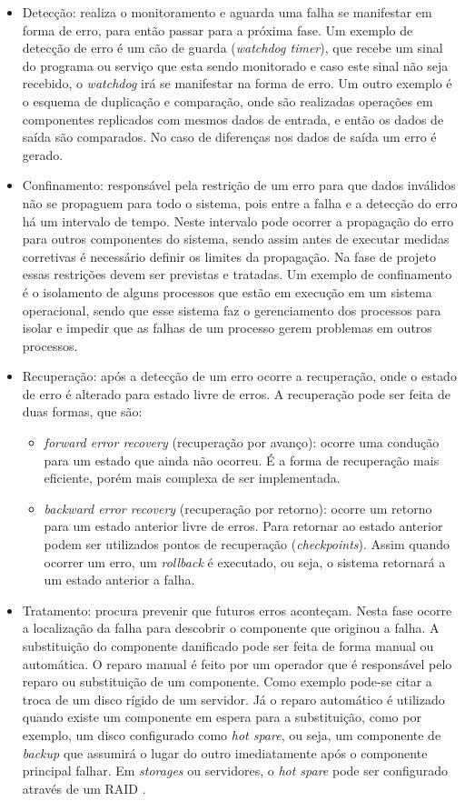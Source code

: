 \begin{itemize}
 \item Detecção: realiza o monitoramento e aguarda uma falha se manifestar em forma de erro, para então passar para a próxima fase. 
 Um exemplo de detecção de erro é um cão de guarda (\textit{watchdog timer}), que recebe um sinal do programa ou serviço que esta sendo 
 monitorado e caso este sinal não seja recebido, o \textit{watchdog} irá se manifestar na forma de erro. 
 Um outro exemplo é o esquema de duplicação e comparação, onde são realizadas operações em componentes replicados com mesmos dados de 
 entrada, e então os dados de saída são comparados. No caso de diferenças nos dados de saída um erro é gerado.
 \item Confinamento: responsável pela restrição de um erro para que dados inválidos não se propaguem para todo o sistema, pois entre a falha e a
 detecção do erro há um intervalo de tempo. Neste intervalo pode ocorrer a propagação do erro para outros componentes do sistema, sendo assim 
 antes de executar medidas corretivas é necessário definir os limites da propagação. Na fase de projeto essas restrições devem ser previstas
 e tratadas. Um exemplo de confinamento é o isolamento de alguns processos que estão em execução em um sistema operacional, sendo que esse 
 sistema faz o gerenciamento dos processos para isolar e impedir que as falhas de um processo gerem problemas em outros processos.
 \item Recuperação: após a detecção de um erro ocorre a recuperação, onde o estado de erro é alterado para estado livre de erros. A recuperação
 pode ser feita de duas formas, que são:
 \begin{itemize}
  \item \textit{forward error recovery} (recuperação por avanço): ocorre uma condução para um estado que ainda não ocorreu. É a forma
  de recuperação mais eficiente, porém mais complexa de ser implementada.
  \item \textit{backward error recovery} (recuperação por retorno): ocorre um retorno para um estado anterior livre de erros.
  Para retornar ao estado anterior podem ser utilizados pontos de recuperação (\textit{checkpoints}). Assim quando ocorrer um erro, um 
  \textit{rollback} é executado, ou seja, o sistema retornará a um estado anterior a falha.
 \end{itemize}
 \item Tratamento: procura prevenir que futuros erros aconteçam. Nesta fase ocorre a localização da falha para descobrir o 
 componente que originou a falha. A substituição do componente danificado pode ser feita de forma manual ou automática. 
 O reparo manual é feito por um operador que é responsável pelo reparo ou substituição de um componente. Como exemplo pode-se citar
 a troca de um disco rígido de um servidor. Já o reparo automático é utilizado quando existe um componente em espera para a substituição, 
 como por exemplo, um disco configurado como \textit{hot spare}, ou seja, um componente de \textit{backup} que assumirá o lugar do 
 outro imediatamente após o componente principal falhar. Em \textit{storages} ou servidores, o \textit{hot spare} pode ser configurado 
 através de um \ac{RAID} \cite{rouse2013}.
\end{itemize}

